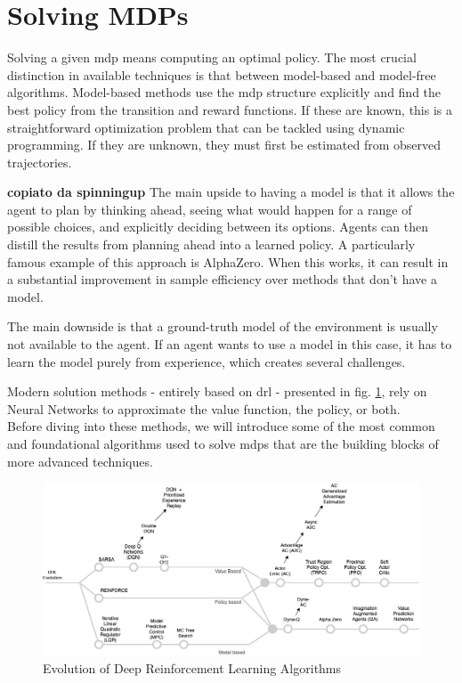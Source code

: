 \documentclass[a4paper,11pt]{report}
\theoremstyle{definition}
\theoremstyle{plain}
\theoremstyle{remark}  %
\begin{document}
\section{Solving MDPs}
Solving a given \gls{mdp} means computing an optimal policy. The most crucial distinction in available techniques 
is that between model-based and model-free algorithms. 
Model-based methods use the \gls{mdp} structure explicitly and find the best policy from the transition and reward functions.
If these are known, this is a straightforward optimization problem that can be tackled using dynamic programming. 
If they are unknown, they must first be estimated from observed trajectories.
{\textbf{copiato da spinningup}
The main upside to having a model is that it allows the agent to plan by thinking ahead, 
seeing what would happen for a range of possible choices, and explicitly deciding between its options. 
Agents can then distill the results from planning ahead into a learned policy. 
A particularly famous example of this approach is AlphaZero.\cite{Silver2017} 
When this works, it can result in a substantial improvement in sample efficiency over methods that don't 
have a model. \cite{SpinningUp2018}

The main downside is that a ground-truth model of the environment is usually not available to the agent. 
If an agent wants to use a model in this case, it has to learn the model purely from experience, which 
creates several challenges.
}
Modern solution methods - entirely based on \gls{drl} - presented in fig. \ref{fig:drl-algorithm-evolution}, rely on 
Neural Networks to approximate the value function, the policy, or both. \\

Before diving into these methods, we will introduce some of the most common and foundational algorithms 
used to solve \gls{mdp}s that are the building blocks of more advanced techniques.

\begin{figure}
    \centering
    \includegraphics[scale=.35]{images/drl-algorithm-evolution.png}
    \caption{Evolution of Deep Reinforcement Learning Algorithms}
    \label{fig:drl-algorithm-evolution}
\end{figure}
\end{document}
